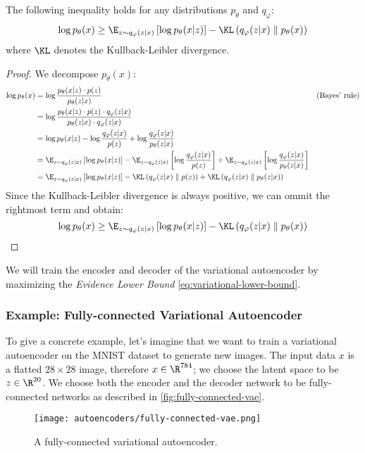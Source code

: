 \begin{property}
    The following inequality holds for any distributions $p_\theta$ and $q_\varphi$:
    \begin{equation}
        \label{eq:variational-lower-bound}
        \log p_\theta(x) \geq \E_{z\sim q_\varphi(z|x)}\left[\log p_\theta(x|z)\right] - \KL\left(q_\varphi(z|x)\parallel p_\theta(x)\right)
    \end{equation}
    where $\KL$ denotes the Kullback-Leibler divergence.
\end{property}
\begin{proof}
    We decompose $p_\theta(x)$:
    \begin{align*}
        \log p_\theta(x) &= \log\frac{p_\theta(x|z)\cdot p(z)}{p_\theta(z|x)} && \text{(Bayes' rule)} \\
        &= \log\frac{p_\theta(x|z)\cdot p(z)\cdot q_\varphi(z|x)}{p_\theta(z|x)\cdot q_\varphi(z|x)} \\
        &= \log p_\theta(x|z) - \log\frac{q_\varphi(z|x)}{p(z)} + \log\frac{q_\varphi(z|x)}{p_\theta(z|x)} \\
        &= \E_{z\sim q_\varphi(z|x)}\left[\log p_\theta(x|z)\right] - \E_{z\sim q_\varphi(z|x)}\left[\log\frac{q_\varphi(z|x)}{p(z)}\right] + \E_{z\sim q_\varphi(z|x)}\left[\log\frac{q_\varphi(z|x)}{p_\theta(z|x)}\right] \\
        &= \E_{z\sim q_\varphi(z|x)}\left[\log p_\theta(x|z)\right] - \KL\left(q_\varphi(z|x)\parallel p(z)\right) + \KL\left(q_\varphi(z|x)\parallel p_\theta(z|x)\right)
    \end{align*}
    Since the Kullback-Leibler divergence is always positive, we can ommit the rightmost term and obtain:
    \begin{equation*}
        \log p_\theta(x) \geq \E_{z\sim q_\varphi(z|x)}\left[\log p_\theta(x|z)\right] - \KL\left(q_\varphi(z|x)\parallel p_\theta(x)\right)
    \end{equation*}
\end{proof}

We will train the encoder and decoder of the variational autoencoder by maximizing the \emph{Evidence Lower Bound} \autoref{eq:variational-lower-bound}.  

\subsubsection{Example: Fully-connected Variational Autoencoder}
To give a concrete example, let's imagine that we want to train a variational autoencoder on the MNIST dataset to generate new images. The input data $x$ is a flatted $28\times28$ image, therefore $x\in\R^{784}$; we choose the latent space to be $z\in\R^{20}$. We choose both the encoder and the decoder network to be fully-connected networks as described in \autoref{fig:fully-connected-vae}.
\begin{figure}[H]
    \centering
    \texttt{[image: autoencoders/fully-connected-vae.png]}
    \caption{A fully-connected variational autoencoder.}
    \label{fig:fully-connected-vae}
\end{figure}

